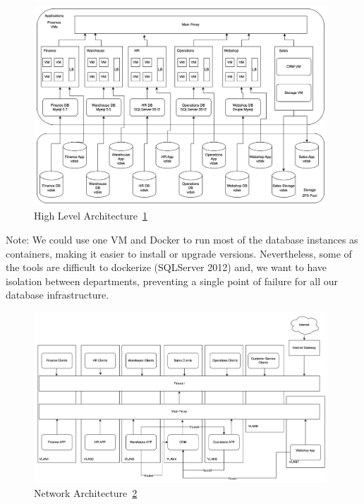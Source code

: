 \documentclass{llncs}
\begin{document}
\begin{figure}[htbp]
  \begin{center}
    \includegraphics[width=11cm]{diagrams/architecture.drawio.png}
    \caption{High Level Architecture~\ref{High_Level_Architecture}}
    \label{High_Level_Architecture} %
  \end{center}
\end{figure}

Note: We could use one VM and Docker to run most of the database instances as containers, making it easier to install or upgrade versions. Nevertheless, some of the tools are difficult to dockerize (SQLServer 2012) and, we want to have isolation between departments, preventing a single point of failure for all our database infrastructure.

\begin{figure}[htbp]
  \begin{center}
    \includegraphics[width=11cm]{diagrams/network_architecture.png}
    \caption{Network Architecture~\ref{Network_Architecture}}
    \label{Network_Architecture} %
  \end{center}
\end{figure}
\end{document}
